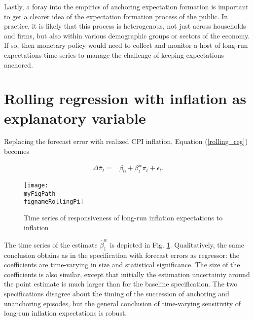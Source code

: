 \documentclass[11pt]{article}
\def \myFigPath {../../figures/}
\def \myBibPath {../../literature/}
\renewcommand{\[}{\begin{equation}}
\renewcommand{\]}{\end{equation}}
\def\fignameRollingPi{rolling_overlapping_pi_command_anchoring_in_data_individual_25_Sep_2020_10_37_43} %
\begin{document}
Lastly, a foray into the empirics of anchoring expectation formation is important to get a clearer idea of the expectation formation process of the public. In practice, it is likely that this process is heterogenous, not just across households and firms, but also within various demographic groups or sectors of the economy. If so, then monetary policy would need to collect and monitor a host of long-run expectations time series to manage the challenge of keeping expectations anchored. 



\clearpage
\newpage



\newpage
\appendix


\section{Rolling regression with inflation as explanatory variable}\label{app_rolling_pi}

Replacing the forecast error with realized CPI inflation, Equation (\ref{rolling_reg}) becomes 

\begin{align*}
\Delta\bar{\pi}_t = & \beta_0 + \beta^w_1 \pi_t + \epsilon_t. 
\label{rolling_reg_pi}
\end{align*}

\begin{figure}[h!]
\texttt{[image: \\myFigPath \\fignameRollingPi]}
\caption{Time series of responsiveness of long-run inflation expectations to inflation}
\label{rolling_pi}
\end{figure}

The time series of the estimate $\hat{\beta}^w_1$ is depicted in Fig. \ref{rolling_pi}. Qualitatively, the same conclusion obtains as in the specification with forecast errors as regressor: the coefficients are time-varying in size and statistical significance. The size of the coefficients is also similar, except that initially the estimation uncertainty around the point estimate is much larger than for the baseline specification. The two specifications disagree about the timing of the succession of anchoring and unanchoring episodes, but the general conclusion of time-varying sensitivity of long-run inflation expectations is robust. 
\end{document}
